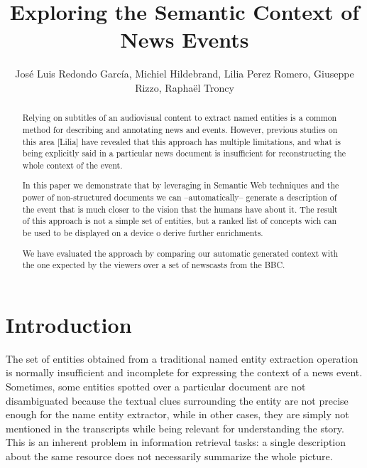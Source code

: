 \documentclass{llncs}
\begin{document}
\frontmatter          %
\pagestyle{headings}  %
\mainmatter              %

\title{Exploring the Semantic Context of News Events}
\author{Jos\'e Luis Redondo Garc\'ia, Michiel Hildebrand, Lilia Perez Romero, Giuseppe Rizzo, Rapha\"el Troncy}


\maketitle              %


\begin{abstract}

Relying on subtitles of an audiovisual content to extract named entities is a common method for describing and annotating news and events. However, previous studies on this area [Lilia] have revealed that this approach has multiple limitations, and what is being explicitly said in a particular news document is insufficient for reconstructing the whole context of the event. 

In this paper we demonstrate that by leveraging in Semantic Web techniques and the power of non-structured documents we can --automatically-- generate a description of the event that is much closer to the vision that the humans have about it. The result of this approach is not a simple set of entities, but a ranked list of concepts wich can be used to be displayed on a device o derive further enrichments.

We have evaluated the approach by comparing our automatic generated context with the one expected by the viewers over a set of newscasts from the BBC.

\end{abstract}


\section{Introduction}
The set of entities obtained from a traditional named entity extraction operation is normally insufficient and incomplete for expressing the context of a news event. Sometimes, some entities spotted over a particular document are not disambiguated because the textual clues surrounding the entity are not precise enough for the name entity extractor, while in other cases, they are simply not mentioned in the transcripts while being relevant for understanding the story. This is an inherent problem in information retrieval tasks: a single description about the same resource does not necessarily summarize the whole picture.
\end{document}

